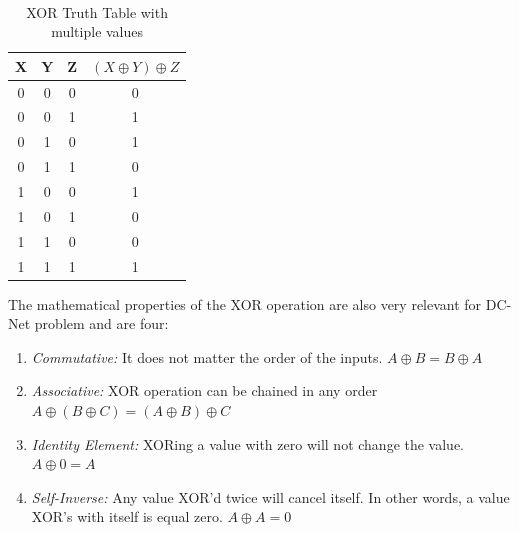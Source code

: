\begin{table}[h!]
\centering
\caption{XOR Truth Table with multiple values}
~\\[0.5ex]
\begin{tabular}{|| c | c | c | c ||} 
 \hline
 X & Y & Z & $(X \oplus Y) \oplus Z$ \\ [0.ex] 
 \hline\hline
 0 & 0 & 0 & 0 \\ 
 0 & 0 & 1 & 1 \\
 0 & 1 & 0 & 1 \\
 0 & 1 & 1 & 0 \\
 1 & 0 & 0 & 1 \\
 1 & 0 & 1 & 0 \\
 1 & 1 & 0 & 0 \\ 
 1 & 1 & 1 & 1 \\ [1ex]
 \hline
\end{tabular}
\label{table:XORextended}
\end{table}

The mathematical properties of the XOR operation are also very relevant for DC-Net problem \cite{Lewin} and are four:
\begin{enumerate} \label{sec:XORproperties} \label{sec:xorproperties}
    \item \textit{Commutative:} It does not matter the order of the inputs. $A \oplus B = B \oplus A$
    \item \textit{Associative:} XOR operation can be chained in any order $A \oplus (B \oplus C) = (A \oplus B) \oplus C$
    \item \textit{Identity Element:} XORing a value with zero will not change the value. $A \oplus 0 = A$
    \item \textit{Self-Inverse:} Any value XOR'd twice will cancel itself. In other words, a value XOR's with itself is equal zero. $A \oplus A = 0$
\end{enumerate}

